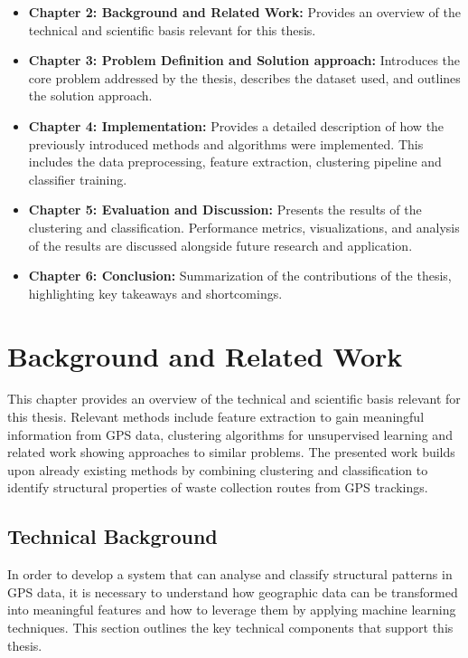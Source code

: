 \documentclass[a4paper,12pt,twoside]{scrreprt}
\begin{document}
\begin{itemize}
  \item \textbf{Chapter 2: Background and Related Work: } Provides an overview
        of the technical and scientific basis relevant for this thesis.
  \item \textbf{Chapter 3: Problem Definition and Solution approach:}
        Introduces the core problem addressed by the thesis, describes the
        dataset
        used, and outlines the solution approach.
  \item \textbf{Chapter 4: Implementation:} Provides a detailed description of
        how the previously introduced methods and algorithms were implemented.
        This
        includes the data preprocessing, feature extraction, clustering
        pipeline and
        classifier training.
  \item \textbf{Chapter 5: Evaluation and Discussion:} Presents the results of
        the clustering and classification. Performance metrics, visualizations,
        and
        analysis of the results are discussed alongside future research and
        application.
  \item \textbf{Chapter 6: Conclusion:} Summarization of the contributions of
        the thesis, highlighting key takeaways and shortcomings.
\end{itemize}

\chapter{Background and Related Work}
This chapter provides an overview of the technical and scientific basis
relevant for this thesis.
Relevant methods include feature extraction to gain meaningful information
from GPS data, clustering algorithms for unsupervised learning and related work
showing approaches to similar problems. The presented work builds upon already
existing methods by combining
clustering and classification to identify structural properties of waste
collection routes from GPS trackings.

\section{Technical Background}
In order to develop a system that can analyse and classify structural patterns
in GPS data, it is necessary to understand how geographic data can be
transformed into meaningful features and how to leverage them by applying
machine learning techniques.
This section outlines the key technical components that support this thesis.
\end{document}
